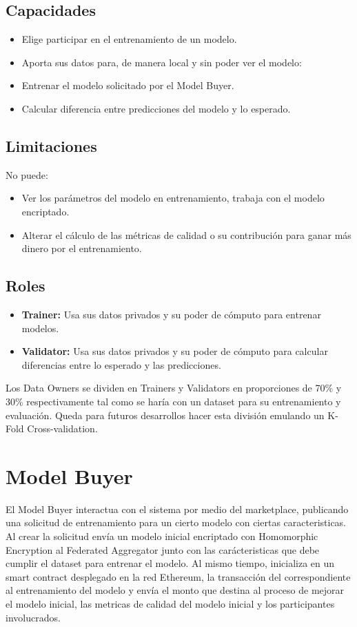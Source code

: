 \documentclass[
11pt, %
oneside, %
spanish, %
singlespacing, %
parskip, %
headsepline, %
chapterinoneline, %
]{MastersDoctoralThesis} %
\begin{document}
\subsection*{Capacidades}
\begin{itemize}
\item Elige participar en el entrenamiento de un modelo.
\item Aporta sus datos para, de manera local y sin poder ver el modelo:
\item Entrenar el modelo solicitado por el Model Buyer.
\item Calcular diferencia entre predicciones del modelo y lo esperado.
\end{itemize}

\subsection*{Limitaciones}
No puede:
\begin{itemize}
\item Ver los parámetros del modelo en entrenamiento, trabaja con el modelo encriptado.
\item Alterar el cálculo de las métricas de calidad o su contribución para ganar más dinero por el entrenamiento. 
\end{itemize}

\subsection*{Roles}
\begin{itemize}
\item \textbf{Trainer:} Usa sus datos privados y su poder de cómputo para entrenar modelos.
\item \textbf{Validator:} Usa sus datos privados y su poder de cómputo para  calcular diferencias entre lo esperado y las predicciones.
\end{itemize}

Los Data Owners se dividen en Trainers y Validators en proporciones de 70\% y 30\% respectivamente tal como se haría con un dataset para su entrenamiento y evaluación. Queda para futuros desarrollos hacer esta división emulando un K-Fold Cross-validation.


\section{Model Buyer}
\justify
El Model Buyer interactua con el sistema por medio del marketplace, publicando una solicitud de entrenamiento para un cierto modelo con ciertas caracteristicas.
Al crear la solicitud envía un modelo inicial encriptado con Homomorphic Encryption al Federated Aggregator junto con  las carácteristicas que debe cumplir el dataset para entrenar el modelo. 
Al mismo tiempo, inicializa en un smart contract desplegado en la red Ethereum, la transacción del correspondiente al entrenamiento del modelo y envía el monto que destina al proceso de mejorar el modelo inicial, las metricas de calidad del modelo inicial y los participantes involucrados.
\end{document}
